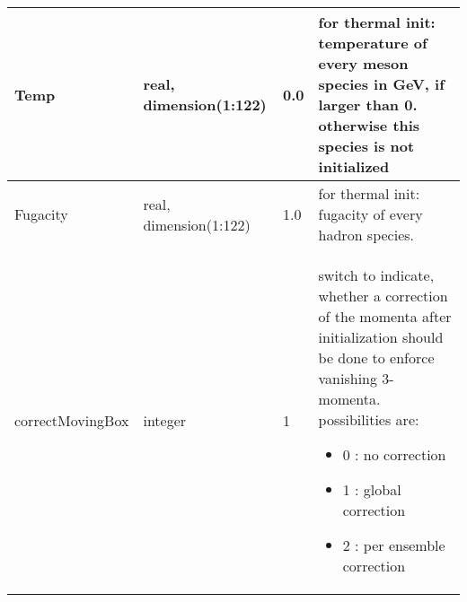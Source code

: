 \documentclass{article}
\begin{document}
\begin{longtable}{llll}
\midrule
Temp & \begin{minipage}[t]{2cm}real, dimension(1:122)\end{minipage} & \begin{minipage}[t]{2cm}0.0\end{minipage} & \begin{minipage}[t]{12cm}for thermal init: temperature of every meson species in GeV, if larger than 0. otherwise this species is not initialized\end{minipage}\\*
\midrule
Fugacity & \begin{minipage}[t]{2cm}real, dimension(1:122)\end{minipage} & \begin{minipage}[t]{2cm}1.0\end{minipage} & \begin{minipage}[t]{12cm}for thermal init: fugacity of every hadron species.\end{minipage}\\*
\midrule
correctMovingBox & \begin{minipage}[t]{2cm}integer\end{minipage} & \begin{minipage}[t]{2cm}1\end{minipage} & \begin{minipage}[t]{12cm}switch to indicate, whether a correction of the momenta after initialization should be done to enforce vanishing 3-momenta. possibilities are:\begin{itemize}\leftmargin0em\itemindent0pt\item 0 : no correction\item 1 : global correction\item 2 : per ensemble correction\end{itemize}\end{minipage}\\*
\bottomrule
\end{longtable}
{ }



\end{document}
